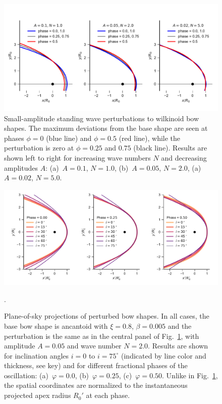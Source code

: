 \begin{figure}[t!]
  \centering
  \includegraphics[width=\linewidth]{figs/compare_xyprime_wave-wilkinoid}
  \caption{Small-amplitude standing wave perturbations to wilkinoid
    bow shapes.  The maximum deviations from the base shape are seen
    at phases \(\phi = 0\) (blue line) and \(\phi = 0.5\) (red line), while
    the perturbation is zero at \(\phi = 0.25\) and \(0.75\) (black
    line).  Results are shown left to right for increasing wave
    numbers \(N\) and decreasing amplitudes \(A\): (a)~\(A = 0.1\),
    \(N = 1.0\), (b)~\(A = 0.05\), \(N = 2.0\), (a)~\(A = 0.02\),
    \(N = 5.0\).}
  \label{fig:perturb-shapes}
\end{figure}

\begin{figure}
  \centering
  \includegraphics[width=\linewidth]
  {figs/wave_xyprime-A005-N20-ancantoid-xi080-beta000500}
  \caption{Plane-of-sky projections of perturbed bow shapes.  In all
    cases, the base bow shape is ancantoid with \(\xi = 0.8\),
    \(\beta = 0.005\) and the perturbation is the same as in the central
    panel of Fig.~\ref{fig:perturb-shapes}, with amplitude
    \(A = 0.05\) and wave number \(N = 2.0\). Results are shown for
    inclination angles \(i = 0\) to \(i = 75^\circ\) (indicated by line
    color and thickness, see key) and for different fractional phases
    of the oscillation: (a)~\(\varphi = 0.0\), (b)~\(\varphi = 0.25\),
    (c)~\(\varphi = 0.50\). Unlike in Fig.~\ref{fig:perturb-shapes},
    the spatial coordinates are normalized to the instantaneous
    projected apex radius \(R_0'\) at each phase.}.
  \label{fig:perturb-xy-prime}
\end{figure}

